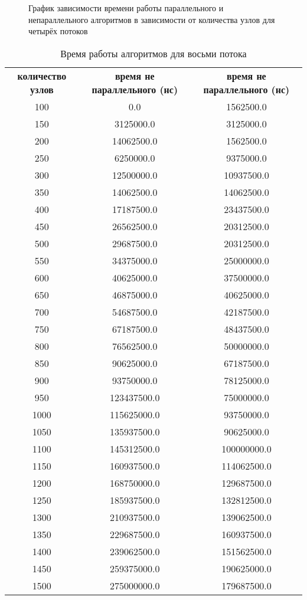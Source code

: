 \begin{figure}[H]
	\caption{График зависимости времени работы параллельного и непараллельного алгоритмов в зависимости от количества узлов для четырёх потоков}
	\label{fig:res_thr_4}
\end{figure}

\begin{table}[H]
  \begin{center}
    \captionsetup{justification=raggedright}
     \caption{Время работы алгоритмов для восьми потока}
    \label{tab:thr_8}
    \begin{tabular}{c|c|c}
      \textbf{количество узлов} & \textbf{время не параллельного (нс)}  & \textbf{время не параллельного (нс)}\\
	100 & 0.0 & 1562500.0\\
	150 & 3125000.0 & 3125000.0\\     
	200 & 14062500.0 & 1562500.0\\    
	250 & 6250000.0 & 9375000.0\\     
	300 & 12500000.0 & 10937500.0\\   
	350 & 14062500.0 & 14062500.0\\   
	400 & 17187500.0 & 23437500.0\\   
	450 & 26562500.0 & 20312500.0\\   
	500 & 29687500.0 & 20312500.0\\   
	550 & 34375000.0 & 25000000.0\\   
	600 & 40625000.0 & 37500000.0\\   
	650 & 46875000.0 & 40625000.0\\   
	700 & 54687500.0 & 42187500.0\\   
	750 & 67187500.0 & 48437500.0\\   
	800 & 76562500.0 & 50000000.0\\   
	850 & 90625000.0 & 67187500.0\\   
	900 & 93750000.0 & 78125000.0\\   
	950 & 123437500.0 & 75000000.0\\  
	1000 & 115625000.0 & 93750000.0\\ 
	1050 & 135937500.0 & 90625000.0\\ 
	1100 & 145312500.0 & 100000000.0\\
	1150 & 160937500.0 & 114062500.0\\
	1200 & 168750000.0 & 129687500.0\\
	1250 & 185937500.0 & 132812500.0\\
	1300 & 210937500.0 & 139062500.0\\
	1350 & 229687500.0 & 160937500.0\\
	1400 & 239062500.0 & 151562500.0\\
	1450 & 259375000.0 & 190625000.0\\
	1500 & 275000000.0 & 179687500.0\\
      \hline	
    \end{tabular}
  \end{center}
\end{table}


